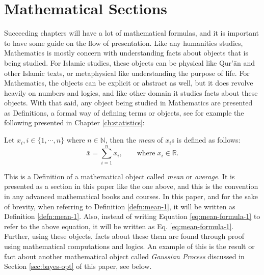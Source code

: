 \section{Mathematical Sections}
Succeeding chapters will have a lot of mathematical formulas, and it is important to have some guide on the flow of presentation. Like any humanities studies, Mathematics is mostly concern with understanding facts about objects that is being studied. For Islamic studies, these objects can be physical like Qur'\=an and other Islamic texts, or metaphysical like understanding the purpose of life. For Mathematics, the objects can be explicit or abstract as well, but it does revolve heavily on numbers and logics, and like other domain it studies facts about these objects. With that said, any object being studied in Mathematics are presented as Definitions, a formal way of defining terms or objects, see for example the following presented in Chapter \ref{ch:statistics}:
\begin{defn}[Mean]\label{defn:mean-1}
Let $x_i, i\in\{1,\cdots,n\}$ where $n\in\mathbb{N}$, then the \textit{mean} of $x_i$s is defined as follows:
\begin{equation}\label{eq:mean-formula-1}
    \bar{x} = \sum_{i=1}^n x_i, \qquad\text{where}\;x_i \in\mathbb{R}.
\end{equation}
\end{defn}
This is a Definition of a mathematical object called \textit{mean} or \textit{average}. It is presented as a section in this paper like the one above, and this is the convention in any advanced mathematical books and courses. In this paper, and for the sake of brevity, when referring to Definition \ref{defn:mean-1}, it will be written as Definition \ref{defn:mean-1}. Also, instead of writing Equation \ref{eq:mean-formula-1} to refer to the above equation, it will be written as Eq. \ref{eq:mean-formula-1}. Further, using these objects, facts about these them are found through proof using mathematical computations and logics. An example of this is the result or fact about another mathematical object called \textit{Gaussian Process} discussed in Section \ref{sec:bayes-opt} of this paper, see below.

